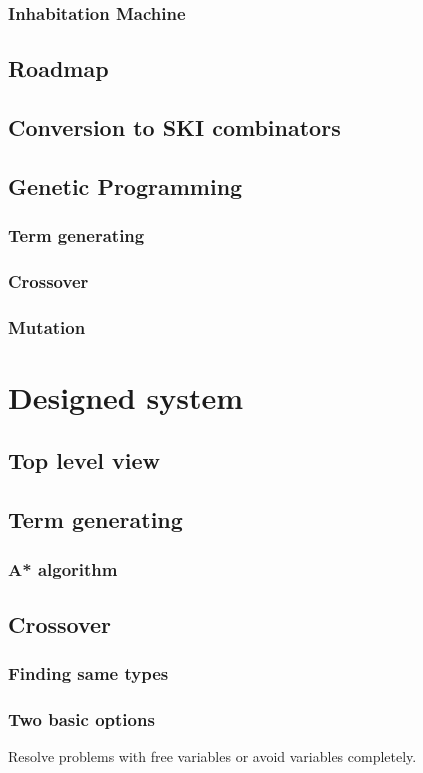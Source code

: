 \documentclass[12pt]{report}
\begin{document}
		\subsection{Inhabitation Machine}
	\section{Roadmap}
	\section{Conversion to SKI combinators}

	\section{Genetic Programming}
		\subsection{Term generating}
		\subsection{Crossover}
		\subsection{Mutation}

\chapter{ Designed system }	
	\section{Top level view}
	\section{Term generating}
		\subsection{A* algorithm}
	\section{Crossover}
		\subsection{Finding same types}
		\subsection{Two basic options}
		Resolve problems with free variables or avoid variables completely. 
		
\end{document}
